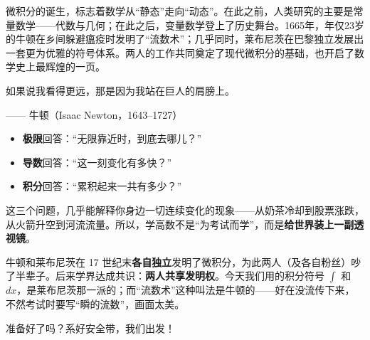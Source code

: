 \documentclass[11pt,a4paper]{article}
\newcommand{\qattr}[1]{{\normalfont\upshape\small\par\raggedleft—— #1\par}}
\newcommand{\keyw}[1]{\colorbox{cYellowL}{\textbf{\color{cOrange}#1}}}
\begin{document}
\begin{center}
\end{center}

微积分的诞生，标志着数学从“静态”走向“动态”。在此之前，人类研究的主要是常量数学——代数与几何；在此之后，变量数学登上了历史舞台。1665年，年仅23岁的牛顿在乡间躲避瘟疫时发明了“流数术”；几乎同时，莱布尼茨在巴黎独立发展出一套更为优雅的符号体系。两人的工作共同奠定了现代微积分的基础，也开启了数学史上最辉煌的一页。

\begin{quotebox}
如果说我看得更远，那是因为我站在巨人的肩膀上。
\qattr{牛顿（Isaac Newton，1643--1727）}
\end{quotebox}

\begin{plainbox}[白话时间]
\begin{itemize}[leftmargin=1.4em,itemsep=3pt]
  \item \textbf{极限}回答：“无限靠近时，到底去哪儿？”
  \item \textbf{导数}回答：“这一刻变化有多快？”
  \item \textbf{积分}回答：“累积起来一共有多少？”
\end{itemize}
这三个问题，几乎能解释你身边一切连续变化的现象——从奶茶冷却到股票涨跌，从火箭升空到河流流量。所以，学高数不是“为考试而学”，而是\keyw{给世界装上一副透视镜}。
\end{plainbox}

\begin{eggbox}
牛顿和莱布尼茨在 17 世纪末\textbf{各自独立}发明了微积分，为此两人（及各自粉丝）吵了半辈子。后来学界达成共识：\textbf{两人共享发明权}。今天我们用的积分符号 $\int$ 和 $dx$，是莱布尼茨那一派的；而“流数术”这种叫法是牛顿的——好在没流传下来，不然考试时要写“瞬的流数”，画面太美。
\end{eggbox}

准备好了吗？系好安全带，我们出发！

\newpage

\end{document}
